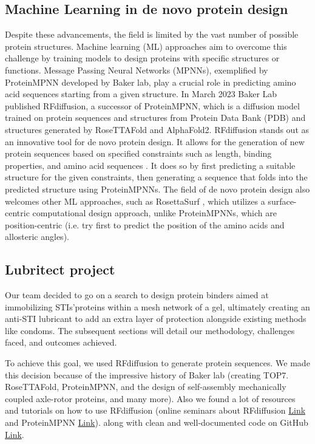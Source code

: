 \documentclass[11pt,a4paper]{article}
\begin{document}
\subsection{Machine Learning in de novo protein design}

Despite these advancements, the field is limited by the vast number of 
possible protein structures. Machine learning (ML) approaches 
aim to overcome this challenge by training models to design proteins 
with specific structures or functions. Message Passing Neural Networks 
(MPNNs), exemplified by ProteinMPNN \cite{dauparas2022robust} developed 
by Baker lab, play a  crucial role in predicting amino acid sequences 
starting from a given structure.
In March 2023 Baker Lab published RFdiffusion, a successor of 
ProteinMPNN, which is a diffusion model trained on protein sequences and 
structures from Protein Data Bank (PDB) and structures generated by 
RoseTTAFold and AlphaFold2. RFdiffusion stands out as an innovative 
tool for de novo protein design. It allows for the generation of new 
protein sequences based on specified constraints such as length, 
binding properties, and amino acid sequences \cite{watson2023novo}. It 
does so by first predicting a suitable structure for the given 
constraints, then generating a sequence that folds into the predicted 
structure using ProteinMPNNs.
The field of de novo protein design also welcomes other ML approaches, 
such as RosettaSurf \cite{scheck2022rosettasurf}, which utilizes a surface-centric computational design approach,
unlike ProteinMPNNs, which are position-centric (i.e. try first to predict the position of the amino acids and allosteric angles).

\subsection{Lubritect project}

Our team decided to go on a search to design protein binders aimed at immobilizing STIs'proteins
within a mesh network of a gel, ultimately creating an anti-STI lubricant to add an extra layer of protection alongside 
existing methods like condoms. The subsequent sections will detail our 
methodology, challenges faced, and outcomes achieved.

To achieve this goal, we used RFdiffusion to generate protein 
sequences. We made this decision because of the impressive history of
Baker lab (creating TOP7. RoseTTAFold, ProteinMPNN, and the design
of self-assembly mechanically coupled axle-rotor proteins, and many more).
Also we found a lot of resources and tutorials on how to use RFdiffusion (online seminars about RFdiffusion
\href{https://www.youtube.com/watch?v=wIHwHDt2NoI}{Link} and ProteinMPNN
\href{https://youtu.be/aVQQuoToTJA?si=PnQvJluY3ZPHo4TO}{Link}).
along with clean and well-documented code on GitHub \href{https://github.com/RosettaCommons/RFdiffusion}{Link}.
\end{document}
